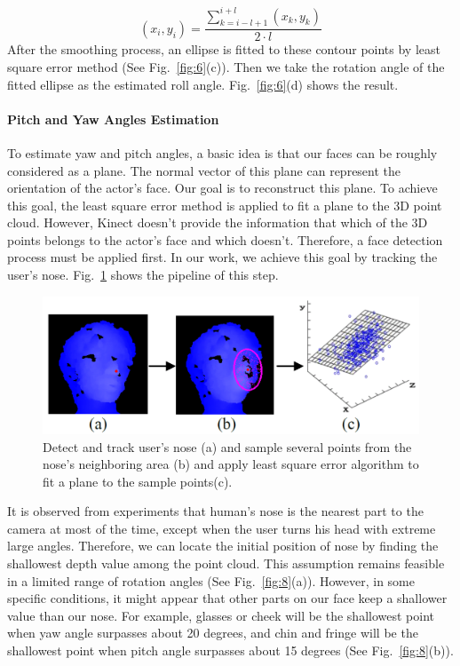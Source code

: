 \begin{equation}
(x_{i},y_{i})=\frac{\sum_{k=i-l+1}^{i+l}{(x_{k},y_{k})}}{2\cdot l}
\end{equation}
After the smoothing process, an ellipse is fitted to these contour points by least square error method (See Fig.~\ref{fig:6}(c)). Then we take the rotation angle of the fitted ellipse as the estimated roll angle. Fig.~\ref{fig:6}(d) shows the result.

\paragraph{Pitch and Yaw Angles Estimation}
To estimate yaw and pitch angles, a basic idea is that our faces can be roughly considered as a plane. The normal vector of this plane can represent the orientation of the actor’s face. Our goal is to reconstruct this plane. To achieve this goal, the least square error method is applied to fit a plane to the 3D point cloud. However, Kinect doesn’t provide the information that which of the 3D points belongs to the actor’s face and which doesn’t. Therefore, a face detection process must be applied first. In our work, we achieve this goal by tracking the user’s nose. Fig.~\ref{fig:7} shows the pipeline of this step.

\begin{figure}
\includegraphics[width=1.0\linewidth]{./fig7.png}
\caption{Detect and track user’s nose (a) and sample several points from the nose’s neighboring area (b) and apply least square error algorithm to fit a plane to the sample points(c).}
\label{fig:7}       %
\end{figure}

It is observed from experiments that human’s nose is the nearest part to the camera at most of the time, except when the user turns his head with extreme large angles. Therefore, we can locate the initial position of nose by finding the shallowest depth value among the point cloud. This assumption remains feasible in a limited range of rotation angles (See Fig.~\ref{fig:8}(a)). However, in some specific conditions, it might appear that other parts on our face keep a shallower value than our nose. For example, glasses or cheek will be the shallowest point when yaw angle surpasses about 20 degrees, and chin and fringe will be the shallowest point when pitch angle surpasses about 15 degrees (See Fig.~\ref{fig:8}(b)).

